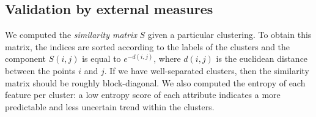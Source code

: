 \subsection{Validation by external measures}
We computed the \textit{similarity matrix} $S$ given a particular clustering. To obtain this matrix, the indices are sorted according to the labels of the clusters and the component $S(i,j)$ is equal to $e^{-d(i,j)}$, where $d(i,j)$ is the euclidean distance between the points $i$ and $j$. If we have well-separated clusters, then the similarity matrix should be roughly block-diagonal. We also computed the entropy of each feature per cluster: a low entropy score of each attribute indicates a more predictable and less uncertain trend within the clusters. 

\begin{figure}[H]
    \centering
    \\
    \\

\end{figure}
